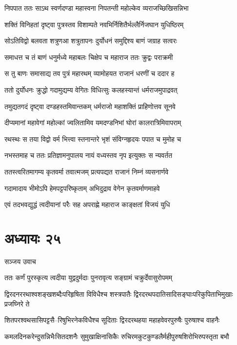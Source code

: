 \twolineshloka
{निपपात ततः साऽथ स्वर्णदण्डा महास्वना}
{निपतन्ती महोल्केव व्यराजच्छिखिसन्निभा}


\twolineshloka
{शक्तिं विनिहतां दृष्ट्वा पुत्रस्तव विशाम्पते}
{नवभिर्निशितैर्भल्लैर्निजघान युधिष्ठिरम्}


\twolineshloka
{सोऽतिविद्वो बलवता शत्रुणआ शत्रुतापनः}
{दुर्योधनं समुद्दिश्य बाणं जग्राह सत्वरः}


\twolineshloka
{समाधत्त च तं बाणं धनुर्मध्ये महाबलः}
{चिक्षेप च महाराज ततः क्रुद्वः पराक्रमी}


\twolineshloka
{स तु बाणः समासाद्य तव पुत्रं महारथम्}
{व्यामोहयत राजानं धरणीं च ददार ह}


\twolineshloka
{ततो दुर्योधनः क्रुद्धो गदामुद्यम्य वेगितः}
{विधित्सुः कलहस्यान्तं धर्मराजमुपाद्रवत्}


\twolineshloka
{तमुद्यतगदं दृष्ट्वा दण्डहस्तमिवान्तकम्}
{धर्मराजो महाशक्तिं प्राहिणोत्तव सूनवे}


\twolineshloka
{दीप्यमानां महावेगां महोल्कां ज्वलितामिव}
{यमदण्डनिभां घोरां कालरात्रिमिवापराम्}


\twolineshloka
{रथस्थः स तया विद्वो वर्म भित्त्वा स्तनान्तरे}
{भृशं संविग्नहृदयः पपात च मुमोह च}


\twolineshloka
{नभस्तमाह च ततः प्रतिज्ञामनुपालय}
{नायं वध्यस्तव नृप इत्युक्तः स न्यवर्तत}


\twolineshloka
{ततस्त्वरितमागम्य कृतवर्मा तवात्मजम्}
{प्रत्यपद्यत राजानं निम्नं व्यसनार्णवे}


\twolineshloka
{गदामादाय भीमोऽपि हेमपट्टपरिष्कृताम्}
{अभिदुद्राव वेगेन कृतवर्माणमाहवे}


\twolineshloka
{एवं तदभवद्युद्धं त्वदीयानां परैः सह}
{अपराह्णे महाराज काङ्क्षतां विजयं युधि}


\chapter{अध्यायः २५}
\twolineshloka
{सञ्जय उवाच}
{}


\twolineshloka
{ततः कर्णं पुरस्कृत्य त्वदीया युद्वदुर्मदाः}
{पुनरावृत्य सङ्ग्रामं चक्रुर्देवासुरोपमम्}


\twolineshloka
{द्विरदनररथाश्वशङ्खशब्दैःपरिहृषिता विविधैश्च शस्त्रपातैः}
{द्विरदरथपदातिसादिसङ्घाःपरिकुपिताभिमुखाः प्रजघ्निरे ते}


\twolineshloka
{शितपरश्वथसासिपट्टसै--रिषुभिरनेकविधैश्च सूदिताः}
{द्विरदरथहया महाहवेवरपुरुषैः पुरुषाश्च वाहनैः}


\twolineshloka
{कमलदिनकरेन्दुसन्निभैःसितदशनैः सुमुखाक्षिनासिकैः}
{रुचिरमकुटकुण्डलैर्महीपुरुषशिरोभिरुपस्तृता बभौ}


